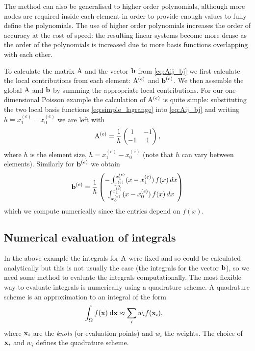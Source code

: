 The method can also be generalised to higher order polynomials, although more nodes are required inside each element in order to provide enough values to fully define the polynomials.
The use of higher order polynomials increases the order of accuracy at the cost of speed: the resulting linear systems become more dense as the order of the polynomials is increased due to more basis functions overlapping with each other.

To calculate the matrix $\mathrm{A}$ and the vector ${\boldsymbol{\mathrm{b}}}$ from \cref{eq:Aij_bj} we first calculate the local contributions from each element: $\mathrm{A}^{(e)}$ and ${\boldsymbol{\mathrm{b}}}^{(e)}$.
We then assemble the global $\mathrm{A}$ and ${\boldsymbol{\mathrm{b}}}$ by summing the appropriate local contributions.
For our one-dimensional Poisson example the calculation of $\mathrm{A}^{(e)}$ is quite
simple: substituting the two local basis functions \cref{eq:simple_lagrange} into
\cref{eq:Aij_bj} and writing $h=x_{1}^{(e)} - x_{0}^{(e)}$ we are left with
\begin{equation}
  \mathrm{A}^{(e)} = \frac{1}{h}
    \begin{pmatrix}
      1 & -1 \\
      -1 & 1
    \end{pmatrix},
\end{equation}
where $h$ is the element size, $h = x_{1}^{(e)}-x_{0}^{(e)}$ (note that $h$ can vary between elements).
Similarly for ${\boldsymbol{\mathrm{b}}}^{(e)}$ we obtain
\begin{equation}
  {\boldsymbol{\mathrm{b}}}^{(e)}=\frac{1}{h}
    \begin{pmatrix}
      -\int_{x_{0}^{(e)}}^{x_{1}^{(e)}}(x-x_{1}^{(e)})\, f(x)\, dx\\
      \int_{x_{0}^{(e)}}^{x_{1}^{(e)}}(x-x_{0}^{(e)})\, f(x)\, dx
    \end{pmatrix}
\end{equation}
which we compute numerically since the entries depend on $f(x)$.



\subsection{Numerical evaluation of integrals}
\label{sec:numer-eval-integrals}

In the above example the integrals for $\mathrm{A}$ were fixed and so could be calculated analytically but this is not usually the case (\eg the integrals for the vector ${\boldsymbol{\mathrm{b}}}$), so we need some method to evaluate the integrals computationally.
The most flexible way to evaluate integrals is numerically using a quadrature scheme.
A quadrature scheme is an approximation to an integral of the form
\begin{equation}
  \begin{aligned}
    {\int_{\Omega} {f(\boldsymbol{\mathrm{x}})} {\; \mathrm{{d}}}\boldsymbol{\mathrm{x}}} &\approx  \sum_i w_i f(\boldsymbol{\mathrm{x}}_i),
  \end{aligned}
\end{equation}
where $\boldsymbol{\mathrm{x}}_i$ are the \emph{knots} (or evaluation points) and $w_i$ the weights.
The choice of $\boldsymbol{\mathrm{x}}_i$ and $w_i$ defines the quadrature scheme.

